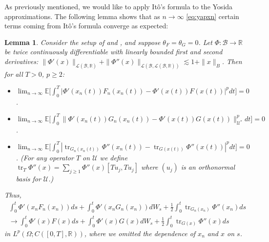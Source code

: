 \documentclass[final]{amsart}
\newtheorem{lem}[thm]{Lemma}
\numberwithin{thm}{section}
\numberwithin{equation}{section}
\newcommand{\E}{\mathbb{E}}
\newcommand{\U}{\mathcal{U}}
\newcommand{\R}{\mathbb{R}}
\newcommand{\Ll}{\mathcal{L}}
\newcommand{\tr}{\operatorname{tr}}
\newcommand{\B}{\mathcal{B}}
\begin{document}
As previously mentioned, we would like to apply It\^{o}'s formula to the Yosida approximations. The following lemma shows that as $n \to \infty$ \eqref{eq:yapxn} certain terms coming from It\^{o}'s formula converge as expected:

\begin{lem}\label{lem:ito-convergence}
    Consider the setup of  and , and suppose $\theta_F = \theta_G = 0$. Let $\Phi: \B \to \R$ be twice continuously differentiable with linearly bounded first and second derivatives: $\|\Phi'(x)\|_{\Ll(\B,\R)} + \|\Phi''(x)\|_{\Ll(\B,\Ll(\B,\R))} \lesssim 1 + \|x\|_B$. Then for all $T > 0$, $p \geq 2$:
    \begin{itemize}
        \item $\lim_{n \to \infty} \E\Big[\int_0^T |\Phi'(x_n(t))F_n(x_n(t)) - \Phi'(x(t))F(x(t))|^pdt\Big] = 0$.
        \item $\lim_{n \to \infty} \E\Big[\int_0^T \|\Phi'(x_n(t))G_n(x_n(t)) - \Phi'(x(t))G(x(t))\|_{\U^*}^pdt\Big] = 0$.
        \item $\lim_{n \to \infty} \E\Big[\int_0^T |\operatorname{tr}_{G_n(x_n(t))}\Phi''(x_n(t)) - \operatorname{tr}_{G(x(t))}\Phi''(x(t))|^pdt\Big] = 0$. (For any operator $T$ on $\U$ we define $\tr_{T}\Phi''(x) = \sum_{j \geq 1} \Phi''(x)[Tu_j, Tu_j]$ where $(u_j)$ is an orthonormal basis for $\U$.)
    \end{itemize}
    Thus,
    \begin{align*}
        \int_0^t \Phi'(x_n F_n(x_n))ds + \int_0^t \Phi'(x_n G_n(x_n)) dW_s + \frac{1}{2}\int_0^t \operatorname{tr}_{G_n(x_n)}\Phi''(x_n)ds \\
        \to \int_0^t \Phi'(x)F(x)ds + \int_0^t \Phi'(x)G(x)dW_s + \frac{1}{2}\int_0^t \operatorname{tr}_{G(x)}\Phi''(x)ds
    \end{align*}
    in $L^p(\Omega; C([0,T], \R))$, where we omitted the dependence of $x_n$ and $x$ on $s$.
\end{lem}
\end{document}
